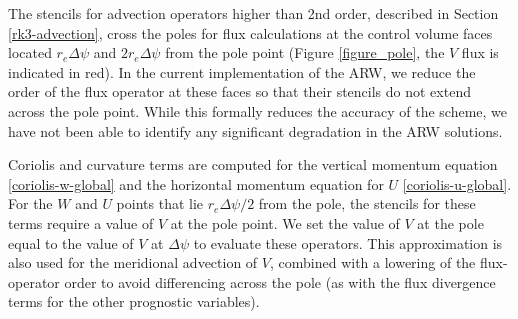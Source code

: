 The stencils for advection operators higher than 2nd order, described in
Section \ref{rk3-advection}, cross the poles for flux calculations at
the control volume faces located $r_e\Delta\psi$ and $2r_e\Delta\psi$
from the pole point (Figure \ref{figure_pole}, the $V$ flux is indicated
in red).  In the current implementation of the ARW, we reduce the order
of the flux operator at these faces so that their stencils do not extend
across the pole point.  While this formally reduces the accuracy of the
scheme, we have not been able to identify any significant degradation in
the ARW solutions.

Coriolis and curvature terms are computed for the vertical momentum
equation \eqref{coriolis-w-global} and the horizontal momentum equation
for $U$ \eqref{coriolis-u-global}.  For the $W$ and $U$ points that lie
$r_e \Delta \psi/2$ from the pole, the stencils for these terms require a
value of $V$ at the pole point.  We set the value of $V$ at the pole
equal to the value of $V$ at $\Delta \psi$ to evaluate these
operators. This approximation is also used for the meridional advection
of $V$, combined with a lowering of the flux-operator order to avoid
differencing across the pole (as with the flux divergence terms for the
other prognostic variables).

